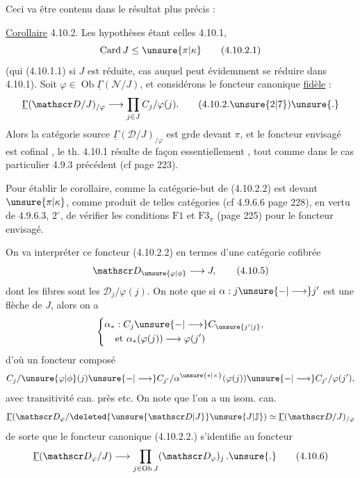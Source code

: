 Ceci va être contenu dans le résultat  plus précis :

\uline{Corollaire} 4.10.2. Les hypothèses étant celles  4.10.1,  
\[
 \operatorname{Card}J\leq\unsure{\pi|\kappa} \tag*{(4.10.2.1)}
\]
(qui   (4.10.1.1) si $J$ est réduite, cas auquel  peut évidemment se réduire dans 4.10.1). Soit $\varphi\in\operatorname{Ob}\underline{\Gamma}(\mathscr N/J)$, et considérons le foncteur canonique \uline{fidèle} :
\[
 \underline{\Gamma}(\mathscr D/J)_{/\varphi}\longrightarrow
 \prod_{j\in J} C_j/\varphi(j). \tag*{(4.10.2.\unsure{2|7})\unsure{.}}
\]
Alors la catégorie source  $\underline{\Gamma}(\mathscr D/J)_{/\varphi}$ est grde devant $\pi$, et le foncteur envisagé est cofinal
, le th. 4.10.1 résulte de façon essentiellement , tout comme dans le cas particulier 4.9.3 précédent (cf page 223). 

Pour établir le corollaire, comme la catégorie-but de (4.10.2.2) est  devant $\unsure{\pi|\kappa}$, comme produit de telles catégories (cf 4.9.6.6 page 228),   en vertu de 4.9.6.3, $2^\circ$, de vérifier les conditions $\mathrm F1$ et $\mathrm F3_{\pi}$  (page 225) pour le foncteur envisagé.

On va interpréter ce foncteur (4.10.2.2) en termes d'une catégorie cofibrée
\[
 \mathscr D_{\unsure{\varphi|\phi}}\longrightarrow J, \tag*{(4.10.5)}
\]
dont les fibres sont les $\mathscr D_j/\varphi(j)$.
On note que si $\alpha:j\unsure{\mathbin{-}|\longrightarrow}j'$ est une flèche de $J$, alors on a
\[
 \left\{\begin{aligned}
 \alpha_* &: C_j\unsure{\mathbin{-}|\longrightarrow} C_{\unsure{j'|j}},\\
 &\text{et }\alpha_*(\varphi(j))\longrightarrow\varphi(j')
 \end{aligned}\right.
\]
d'où un foncteur composé
\[
 C_j/\unsure{\varphi|\phi}(j)\unsure{\mathbin{-}|\longrightarrow}
 C_{j'}/\alpha^{\unsure{*|\times}}(\varphi(j))\unsure{\mathbin{-}|\longrightarrow}
 C_{j'}/\varphi(j'),
\]
avec transitivité   can. près etc.
On note que l'on a un isom. can.
\[
 \underline{\Gamma}(\mathscr D_{\varphi}/\deleted{\unsure{\mathscr D|J}}\unsure{J|\mathbb J})\simeq
 \underline{\Gamma}(\mathscr D/J)_{/\varphi}
\]
de sorte que le foncteur  canonique (4.10.2.2.) s'identifie au foncteur
\[
 \underline{\Gamma}(\mathscr D_{\varphi}/J)\longrightarrow
 \prod_{j\in\operatorname{Ob}J}(\mathscr D_{\varphi})_j\,.\unsure{.} \tag*{(4.10.6)}
\]


